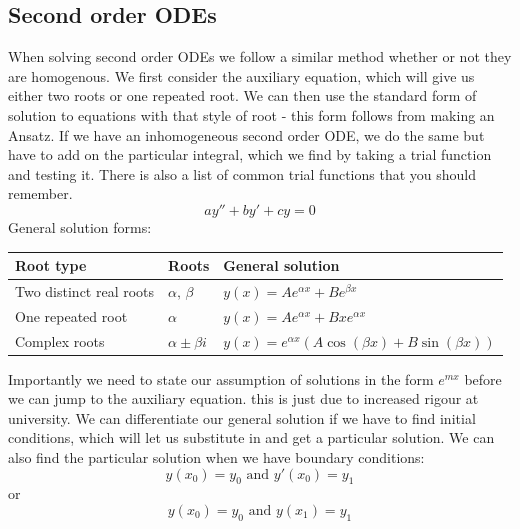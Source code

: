 \documentclass[12pt]{article}
\begin{document}
\subsection*{Second order ODEs}
When solving second order ODEs we follow a similar method whether or not they are homogenous. We first consider the auxiliary equation, which will give us either two roots or one repeated root. We can then use the standard form of solution to equations with that style of root - this form follows from making an Ansatz. If we have an inhomogeneous second order ODE, we do the same but have to add on the particular integral, which we find by taking a trial function and testing it. There is also a list of common trial functions that you should remember.
\[ay''+by'+cy=0\]
General solution forms:
\begin{table}[H]
    \begin{tabular}{|l|l|l|}
    \hline
        \textbf{Root type} & \textbf{Roots} & \textbf{General solution} \\ \hline
        Two distinct real roots & \(\alpha,\,\beta\) & \(y(x)=Ae^{\alpha x}+Be^{\beta x}\) \\ \hline
        One repeated root & \(\alpha\) & \(y(x)=Ae^{\alpha x}+Bxe^{\alpha x}\) \\ \hline
        Complex roots & \(\alpha\pm\beta i\) & \(y(x)=e^{\alpha  x}\left(A\cos(\beta x)+B\sin(\beta x)\right)\) \\ \hline
    \end{tabular}
\end{table}
Importantly we need to state our assumption of solutions in the form \(e^{mx}\) before we can jump to the auxiliary equation. this is just due to increased rigour at university. We can differentiate our general solution if we have to find initial conditions, which will let us substitute in and get a particular solution. We can also find the particular solution when we have boundary conditions:
\[y(x_0)=y_0\text{ and }y'(x_0)=y_1\]
or
\[y(x_0)=y_0 \text{ and }y(x_1)=y_1\]
\end{document}
